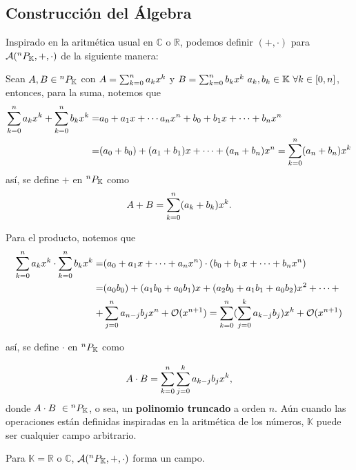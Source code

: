 \subsection{Construcción del Álgebra}
\label{sec:alg_field}

Inspirado en la aritmética usual en $\mathbb{C}$ o $\mathbb{R}$, podemos definir $(+,\cdot)$ para $\mathcal{A}(^{n}P_{\mathbb{K}},+,\cdot)$ de la siguiente manera:

Sean $A,B \in {^{n}P_{\mathbb{K}}}$ con $A = \sum_{k=0}^n a_k x^k$ y $B = \sum_{k=0}^n b_k x^k \ a_k,b_k \in \mathbb{K} \ \forall k \in [0,n]$, entonces, para la suma, notemos que
\begin{align*}
\sum_{k=0}^n a_k x^k + \sum_{k=0}^n b_k x^k =& a_0 + a_1 x + \cdots a_n x^n + b_0 + b_1 x + \cdots + b_n x^n \\
=& (a_0 + b_0) + (a_1 + b_1) x + \cdots + (a_n + b_n)x^n = \sum_{k=0}^n (a_n + b_n) x^k 
\end{align*}
así, se define \textbf{$+$}  en ${^{n}P_{\mathbb{K}}}$ como
\begin{equation}
A + B = \sum_{k=0}^n (a_k + b_k) x^k.
\label{eq:polsum}
\end{equation}

Para el producto, notemos que
\begin{align*}
\sum_{k=0}^n a_k x^k\cdot\sum_{k=0}^n b_k x^k =& (a_0 + a_1 x + \cdots + a_n x^n)\cdot(b_0 + b_1 x + \cdots + b_n x^n) \\
=& (a_0b_0) + (a_1b_0 + a_0b_1) x + (a_2b_0 + a_1b_1 + a_0b_2) x^2 + \cdots + \\
+& \sum_{j=0}^n a_{n-j}b_j x^n + \mathcal{O}(x^{n+1}) = \sum_{k=0}^n  (\sum_{j=0}^k a_{k-j}b_j  )  x^k + \mathcal{O}(x^{n+1})
\end{align*}

así, se define \textbf{$\cdot$}  en ${^{n}P_{\mathbb{K}}}$ como

\begin{equation}
A \cdot B = \sum_{k=0}^n \sum_{j=0}^k a_{k-j}b_j x^k,
\label{eq:polprod}
\end{equation}
donde $ A \cdot B \ \in \pk$, o sea, un \textbf{polinomio truncado} a orden $n$. Aún cuando las operaciones están definidas inspiradas en la aritmética de los números, $\mathbb{K}$ puede ser cualquier campo arbitrario.

\begin{proposicion}
Para $\mathbb{K} = \mathbb{R}$ o $\mathbb{C}$, $\mathcal{A}(^{n}P_{\mathbb{K}},+,\cdot)$ forma un campo.
\label{prop:alg_field}
\end{proposicion}


